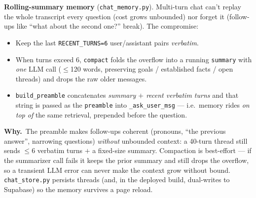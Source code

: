 \documentclass[11pt,a4paper]{article}
\newcommand{\why}[1]{%
  \par\vspace{2pt}%
  \noindent\colorbox{mist}{\begin{minipage}{\dimexpr\linewidth-2\fboxsep}%
  \textcolor{accent2}{\textbf{Why.}}~#1\end{minipage}}\par\vspace{3pt}}
\newcommand{\code}[1]{\texttt{\small #1}}
\begin{document}
\smallskip
\noindent\textbf{Rolling-summary memory} (\code{chat\_memory.py}). Multi-turn chat can't replay
the whole transcript every question (cost grows unbounded) nor forget it (follow-ups like
``what about the second one?'' break). The compromise:
\begin{itemize}
\item Keep the last \code{RECENT\_TURNS=6} user/assistant pairs \emph{verbatim}.
\item When turns exceed 6, \code{compact} folds the overflow into a running \code{summary} with
\emph{one} LLM call ($\le$120 words, preserving goals / established facts / open threads) and
drops the raw older messages.
\item \code{build\_preamble} concatenates \emph{summary $+$ recent verbatim turns} and that string
is passed as the \code{preamble} into \code{\_ask\_user\_msg} --- i.e.\ memory rides \emph{on top
of} the same retrieval, prepended before the question.
\end{itemize}

\begin{center}
\end{center}
\why{The preamble makes follow-ups coherent (pronouns, ``the previous answer'', narrowing
questions) \emph{without} unbounded context: a 40-turn thread still sends $\le$6 verbatim turns
$+$ a fixed-size summary. Compaction is best-effort --- if the summarizer call fails it keeps the
prior summary and still drops the overflow, so a transient LLM error can never make the context
grow without bound. \code{chat\_store.py} persists threads (and, in the deployed build, dual-writes
to Supabase) so the memory survives a page reload.}
\end{document}
